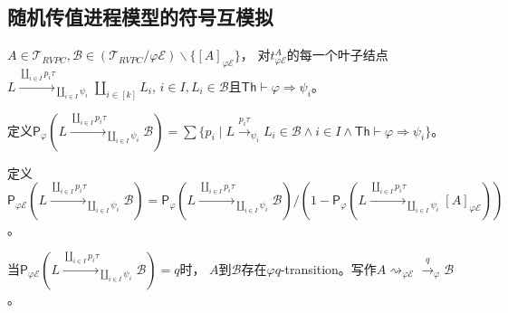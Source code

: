 \subsection{随机传值进程模型的符号互模拟}
\begin{definition}
   $A\in \mathcal{T}_{RVPC},\mathcal{B}\in (\mathcal{T}_{RVPC}/\varphi \mathcal{E})\backslash \{[A]_{\varphi\mathcal{E}}\}$，
对$t^A_{\varphi \mathcal{E}}$的每一个叶子结点$L\stackrel{\coprod_{i\in I}p_i\tau}{\longrightarrow}_{\coprod_{i\in I}\psi_i} \coprod_{i\in [k]}L_i$,
$i\in I, L_i\in \mathcal{B}$且$\mathsf{Th}\vdash \varphi \Rightarrow \psi_i$。

定义$\mathsf{P}_\varphi(L\stackrel{\coprod_{i\in I}p_i\tau}{\longrightarrow}_{\coprod_{i\in I}\psi_i}\mathcal{B}) = \sum\{p_i\mid L\stackrel{p_i\tau}{\rightarrow}_{\psi_i} L_i\in\mathcal{B} \wedge i\in I \wedge \mathsf{Th}\vdash \varphi \Rightarrow \psi_i\}$。

定义$\mathsf{P}_{\varphi \mathcal{E}}(L\stackrel{\coprod_{i\in I}p_i\tau}{\longrightarrow}_{\coprod_{i\in I}\psi_i}\mathcal{B}) = \mathsf{P}_\varphi(L\stackrel{\coprod_{i\in I}p_i\tau}{\longrightarrow}_{\coprod_{i\in I}\psi_i}\mathcal{B})/(1-\mathsf{P}_\varphi(L\stackrel{\coprod_{i\in I}p_i\tau}{\longrightarrow}_{\coprod_{i\in I}\psi_i}[A]_{\varphi\mathcal{E}}))$。

当$\mathsf{P}_{\varphi \mathcal{E}}(L\stackrel{\coprod_{i\in I}p_i\tau}{\longrightarrow}_{\coprod_{i\in I}\psi_i}\mathcal{B})=q$时，
$A$到$\mathcal{B}$存在$\varphi q$-transition。写作$A\rightsquigarrow_{\varphi\mathcal{E}} \stackrel{q}{\rightarrow}_{\varphi} \mathcal{B}$。
\end{definition}



